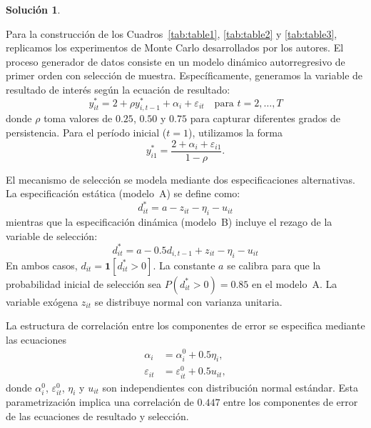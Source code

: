 \documentclass[12pt,letterpaper,reqno,oneside]{amsart}
\theoremstyle{problemstyle} %
\theoremstyle{definition} %
\newtheorem{solution}{Solución}[problem]
\begin{document}
\begin{solution} %
  \label{sol:1}

  Para la construcción de los Cuadros~\ref{tab:table1}, \ref{tab:table2} y \ref{tab:table3}, replicamos los experimentos de Monte Carlo desarrollados por los autores.
  El proceso generador de datos consiste en un modelo dinámico autorregresivo de primer orden con selección de muestra.
  Específicamente, generamos la variable de resultado de interés según la ecuación de resultado:
  \begin{equation*}
    y_{it}^* = 2 + \rho y_{i,t-1}^* + \alpha_i + \varepsilon_{it} \quad \text{para } t = 2, \ldots, T
  \end{equation*}
  donde $\rho$ toma valores de $0.25$, $0.50$ y $0.75$ para capturar diferentes grados de persistencia.
  Para el período inicial ($t = 1$), utilizamos la forma
  \begin{equation*}
    y_{i1}^* = \frac{2 + \alpha_i + \varepsilon_{i1}}{1 - \rho}.
  \end{equation*}

  El mecanismo de selección se modela mediante dos especificaciones alternativas.
  La especificación estática (modelo~A) se define como:
  \begin{equation*}
    d_{it}^* = a - z_{it} - \eta_i - u_{it}
  \end{equation*}
  mientras que la especificación dinámica (modelo~B) incluye el rezago de la variable de selección:
  \begin{equation*}
    d_{it}^* = a - 0.5 d_{i,t-1} + z_{it} - \eta_i - u_{it}
  \end{equation*}
  En ambos casos, $d_{it} = \mathbf{1}[d_{it}^* > 0]$. La constante $a$ se calibra para que la probabilidad inicial de selección sea $P(d_{it}^* > 0) = 0.85$ en el modelo~A.
  La variable exógena $z_{it}$ se distribuye normal con varianza unitaria.

  La estructura de correlación entre los componentes de error se especifica mediante las ecuaciones
  \begin{align*}
    \alpha_i         & = \alpha_i^0 + 0.5 \eta_i,         \\
    \varepsilon_{it} & = \varepsilon_{it}^0 + 0.5 u_{it},
  \end{align*}
  donde $\alpha_i^0$, $\varepsilon_{it}^0$, $\eta_i$ y $u_{it}$ son independientes con distribución normal estándar.
  Esta parametrización implica una correlación de $0.447$ entre los componentes de error de las ecuaciones de resultado y selección.


\end{solution}
\end{document}
